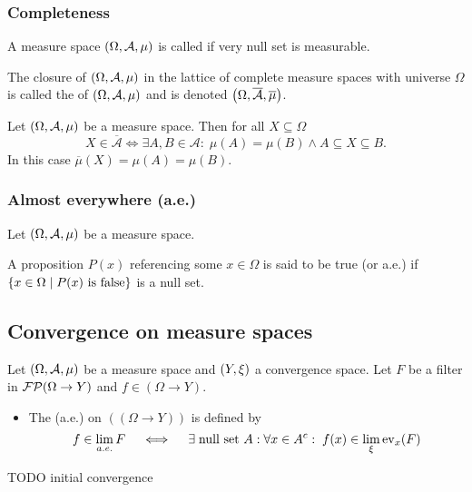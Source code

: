 \subsubsection{Completeness}
\begin{definition}
A measure space $\left( \Omega, \mathcal{A}, \mu \right)$ is called  if very null set is
measurable.

The closure of $\left( \Omega, \mathcal{A}, \mu \right)$ in the lattice of complete measure spaces with universe $\Omega$ is called the  of $\left( \Omega, \mathcal{A}, \mu \right)$ and is denoted $\left( \Omega, \overline{\mathcal{A}}, \overline{\mu} \right)$.
\end{definition}



\begin{proposition}
Let $\left( \Omega, \mathcal{A}, \mu \right)$ be a measure space. Then for all $X\subseteq \Omega$
\[ X\in \overline{\mathcal{A}} \iff \exists A,B \in \mathcal{A}: \; \mu(A) = \mu(B) \land A \subseteq X\subseteq B. \]
In this case $\overline{\mu}(X) = \mu(A) = \mu(B)$.
\end{proposition}

\subsubsection{Almost everywhere (a.e.)}
\begin{definition}
Let $\left( \Omega, \mathcal{A}, \mu \right)$ be a measure space.

A proposition $P(x)$ referencing some $x\in\Omega$ is said to be true  (or a.e.) if $\left\{ x\in\Omega \;\middle|\; \text{$P(x)$ is false} \right\}$ is a null set.
\end{definition}

\subsection{Convergence on measure spaces}
\begin{definition}
Let $\left( \Omega, \mathcal{A}, \mu \right)$ be a measure space and $\left( Y,\xi \right)$ a convergence space. Let $F$ be a filter in $\operatorname{\mathcal{FP}}(\Omega\to Y)$ and $f\in (\Omega\to Y)$.
\begin{itemize}
\item The  (a.e.) on $((\Omega\to Y))$ is defined by
\[ f\in \lim_{a.e.} F \quad\iff\quad \exists \;\text{null set $A$}: \forall x\in A^c: \; f(x) \in \lim_\xi \operatorname{ev}_x(F) \]
\end{itemize}
\end{definition}
TODO initial convergence

